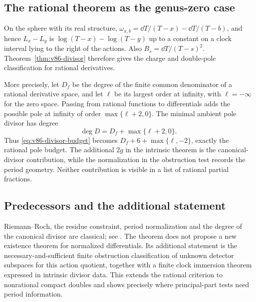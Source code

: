 \subsection{The rational theorem as the genus-zero case}
On the sphere with its real structure,
$\omega_{x,b}=\dd T/(T-x)-\dd T/(T-b)$, and hence
$L_x-L_y$ is $\log(T-x)-\log(T-y)$ up to a constant on a clock
interval lying to the right of the actions. Also
$B_s=\dd T/(T-s)^2$. Theorem~\ref{thm:v86-divisor} therefore gives
the charge and double-pole classification for rational derivatives.

More precisely, let $D_f$ be the degree of the finite common
denominator of a rational derivative space, and let $\ell$ be its
largest order at infinity, with $\ell=-\infty$ for the zero space.
Passing from rational functions to differentials adds the possible
pole at infinity of order $\max\{\ell+2,0\}$. The minimal ambient
pole divisor has degree
\[
              \deg D=D_f+\max\{\ell+2,0\}.
\]
Thus \eqref{eq:v86-divisor-budget} becomes
$D_f+6+\max\{\ell,-2\}$, exactly the rational pole budget. The
additional $2g$ in the intrinsic theorem is the canonical-divisor
contribution, while the normalization in the obstruction test records
the period geometry. Neither contribution is visible in a list of
rational partial fractions.

\subsection{Predecessors and the additional statement}
Riemann--Roch, the residue constraint, period normalization and the
degree of the canonical divisor are classical; see
\cite{V86Forster,V86GKN}. The theorem does not propose a new existence
theorem for normalized differentials. Its additional statement is the
necessary-and-sufficient finite obstruction classification of unknown
detector subspaces for this action quotient, together with a finite
clock immersion theorem expressed in intrinsic divisor data. This
extends the rational criterion to nonrational compact doubles and
shows precisely where principal-part tests need period information.
